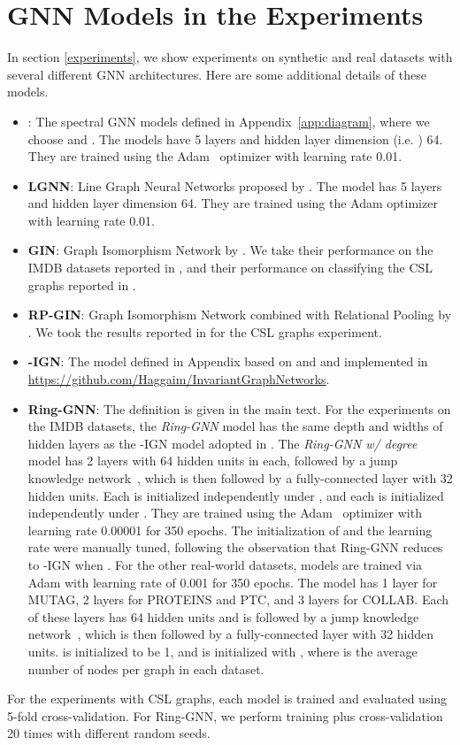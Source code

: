 \documentclass{article}
\begin{document}
\section{GNN Models in the Experiments}
\label{archi}
In section \ref{experiments}, we show experiments on synthetic and real datasets with several different GNN architectures. Here are some additional details of these models.
\begin{itemize}
\item : The spectral GNN models defined in Appendix~\ref{app:diagram}, where we choose  and .
The models have 5 layers and hidden layer dimension (i.e. ) 64. They are trained using the Adam~\cite{kingma2014adam} optimizer with learning rate 0.01.
\item \textbf{LGNN}: Line Graph Neural Networks proposed by \cite{chen2019cdsbm}. The model has 5 layers and hidden layer dimension 64. They are trained using the Adam optimizer with learning rate 0.01.
\item \textbf{GIN}: Graph Isomorphism Network by \cite{xu2018powerful}. We take their performance on the IMDB datasets reported in \cite{xu2018powerful}, and their performance on classifying the CSL graphs reported in \cite{murphy2019relational} .
\item \textbf{RP-GIN}: Graph Isomorphism Network combined with Relational Pooling by \cite{murphy2019relational}. We took the results reported in \cite{murphy2019relational} for the CSL graphs experiment.
\item \textbf{-IGN}: The model defined in Appendix based on \cite{maron2018invariant} and \cite{maron2019universality} and implemented in \url{https://github.com/Haggaim/InvariantGraphNetworks}.
\item \textbf{Ring-GNN}: The definition is given in the main text. For the experiments on the IMDB datasets, the \emph{Ring-GNN} model has the same depth and widths of hidden layers as the -IGN model adopted in \cite{maron2018invariant}. The \emph{Ring-GNN w/ degree} model has 2 layers with 64 hidden units in each, followed by a jump knowledge network~\cite{xu2018representation}, which is then followed by a fully-connected layer with 32 hidden units. Each  is initialized independently under , and each  is initialized independently under . They are trained using the Adam~\cite{kingma2014adam} optimizer with learning rate 0.00001 for 350 epochs. The initialization of  and the learning rate were manually tuned, following the observation that Ring-GNN reduces to -IGN when .
For the other real-world datasets, models are trained via Adam with learning rate of 0.001 for 350 epochs. The model has 1 layer for MUTAG, 2 layers for PROTEINS and PTC, and 3 layers for COLLAB. Each of these layers has 64 hidden units and is followed by a jump knowledge network~\cite{xu2018representation}, which is then followed by a fully-connected layer with 32 hidden units.  is initialized to be 1, and  is initialized with , where  is the average number of nodes per graph in each dataset.
\end{itemize}

For the experiments with CSL graphs, each model is trained and evaluated using 5-fold cross-validation. For Ring-GNN, we perform training plus cross-validation 20 times with different random seeds.
\end{document}
